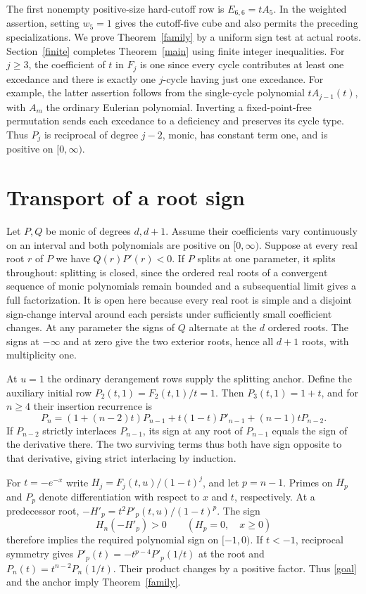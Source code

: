 \documentclass[11pt]{article}
\begin{document}
The first nonempty positive-size hard-cutoff row is \(E_{6,6}=tA_5\). In the weighted assertion, setting \(w_5=1\) gives the cutoff-five cube and also permits the preceding specializations.
We prove Theorem~\ref{family} by a uniform sign test at actual roots. Section~\ref{finite} completes Theorem~\ref{main} using finite integer inequalities. For \(j\ge3\), the coefficient of \(t\) in \(F_j\) is one since every cycle contributes at least one excedance and there is exactly one \(j\)-cycle having just one excedance. For example, the latter assertion follows from the single-cycle polynomial \(tA_{j-1}(t)\), with \(A_m\) the ordinary Eulerian polynomial. Inverting a fixed-point-free permutation sends each excedance to a deficiency and preserves its cycle type. Thus \(P_j\) is reciprocal of degree \(j-2\), monic, has constant term one, and is positive on \([0,\infty)\).

\section{Transport of a root sign}\label{transport}
Let \(P,Q\) be monic of degrees \(d,d+1\). Assume their coefficients vary continuously on an interval and both polynomials are positive on \([0,\infty)\). Suppose at every real root \(r\) of \(P\) we have \(Q(r)P'(r)<0\). If \(P\) splits at one parameter, it splits throughout: splitting is closed, since the ordered real roots of a convergent sequence of monic polynomials remain bounded and a subsequential limit gives a full factorization. It is open here because every real root is simple and a disjoint sign-change interval around each persists under sufficiently small coefficient changes. At any parameter the signs of \(Q\) alternate at the \(d\) ordered roots. The signs at \(-\infty\) and at zero give the two exterior roots, hence all \(d+1\) roots, with multiplicity one.

At \(u=1\) the ordinary derangement rows supply the splitting anchor. Define the auxiliary initial row \(P_2(t,1)=F_2(t,1)/t=1\). Then \(P_3(t,1)=1+t\), and for \(n\ge4\) their insertion recurrence is
\[
 P_n=(1+(n-2)t)P_{n-1}+t(1-t)P'_{n-1}+(n-1)tP_{n-2}.
\]
If \(P_{n-2}\) strictly interlaces \(P_{n-1}\), its sign at any root of \(P_{n-1}\) equals the sign of the derivative there. The two surviving terms thus both have sign opposite to that derivative, giving strict interlacing by induction.

For \(t=-e^{-x}\) write \(H_j=F_j(t,u)/(1-t)^j\), and let \(p=n-1\). Primes on \(H_p\) and \(P_p\) denote differentiation with respect to \(x\) and \(t\), respectively. At a predecessor root, \(-H'_p=t^2P'_p(t,u)/(1-t)^p\). The sign
\begin{equation}\label{goal}
 H_n(-H'_p)>0\qquad(H_p=0,\quad x\ge0)
\end{equation}
therefore implies the required polynomial sign on \([-1,0)\). If \(t<-1\), reciprocal symmetry gives \(P'_p(t)=-t^{p-4}P'_p(1/t)\) at the root and \(P_n(t)=t^{n-2}P_n(1/t)\). Their product changes by a positive factor. Thus \eqref{goal} and the anchor imply Theorem~\ref{family}.
\end{document}
